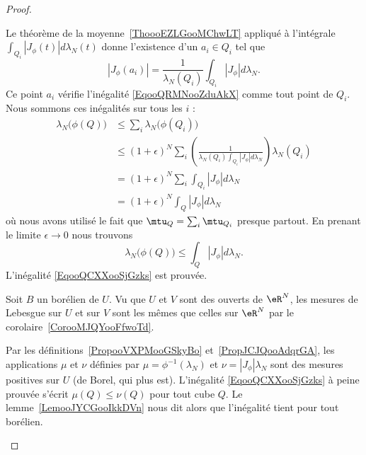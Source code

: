 \begin{proof}
\begin{enumerate}
\begin{subproof}
			      Le théorème de la moyenne~\ref{ThoooEZLGooMChwLT} appliqué à l'intégrale \( \int_{Q_i}| J_{\phi}(t) |d\lambda_N(t)\) donne l'existence d'un \( a_i\in Q_i\) tel que
			      \begin{equation}
				      | J_{\phi}(a_i) |=\frac{1}{ \lambda_N(Q_i) }\int_{Q_i}| J_{\phi} |d\lambda_N.
			      \end{equation}
			      Ce point \( a_i\) vérifie l'inégalité \eqref{EqooQRMNooZduAkX} comme tout point de \( Q_i\). Nous sommons ces inégalités sur tous les \( i\) :
			      \begin{subequations}
				      \begin{align}
					      \lambda_N\big( \phi(Q) \big) & \leq\sum_i\lambda_N\big( \phi(Q_i) \big)                                                                         \\
					                                   & \leq (1+\epsilon)^N\sum_i\left( \frac{1}{ \lambda_N(Q_i)\int_{Q_i}| J_{\phi} |d\lambda_N } \right)\lambda_N(Q_i) \\
					                                   & =(1+\epsilon)^N\sum_i\int_{Q_i}| J_{\phi} |d\lambda_N                                                            \\
					                                   & =(1+\epsilon)^N\int_Q| J_{\phi} |d\lambda_N
				      \end{align}
			      \end{subequations}
			      où nous avons utilisé le fait que \( \mtu_Q=\sum_i\mtu_{Q_i}\) presque partout. En prenant le limite \( \epsilon\to 0\) nous trouvons
			      \begin{equation}
				      \lambda_N\big( \phi(Q) \big)\leq \int_Q| J_{\phi} |d\lambda_N.
			      \end{equation}
			      L'inégalité \eqref{EqooQCXXooSjGzks} est prouvée.

			      Soit \( B\) un borélien de \( U\). Vu que \( U\) et \( V\) sont des ouverts de \( \eR^N\), les mesures de Lebesgue sur \( U\) et sur \( V\) sont les mêmes que celles sur \( \eR^N\)  par le corolaire~\ref{CorooMJQYooFfwoTd}.

			      Par les définitions~\ref{PropooVXPMooGSkyBo} et~\ref{PropJCJQooAdqrGA}, les applications \( \mu\) et \( \nu\) définies par \( \mu=\phi^{-1}(\lambda_N)\) et \( \nu=| J_{\phi} |\lambda_N\) sont des mesures positives sur \( U\) (de Borel, qui plus est). L'inégalité \eqref{EqooQCXXooSjGzks} à peine prouvée s'écrit \( \mu(Q)\leq \nu(Q)\) pour tout cube \( Q\). Le lemme~\ref{LemooJYCGooIkkDVn} nous dit alors que l'inégalité tient pour tout borélien.


\end{subproof}
\end{enumerate}
\end{proof}
